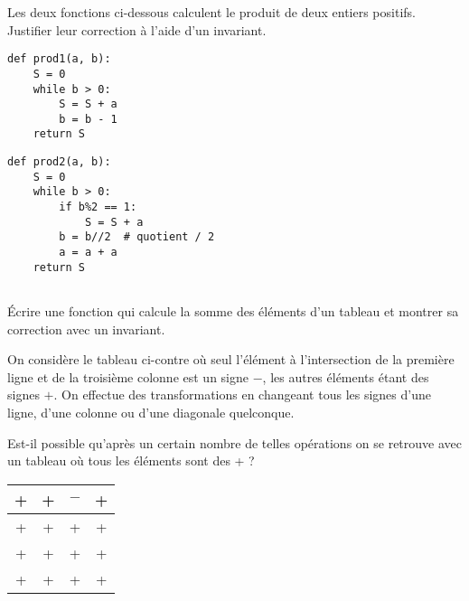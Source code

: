 \exercice{}
Les deux fonctions ci-dessous calculent le produit de deux entiers positifs. Justifier leur correction à l'aide d'un invariant.

\begin{minipage}{0.4\linewidth} 
 \begin{lstlisting}
def prod1(a, b):
    S = 0
    while b > 0:
        S = S + a
        b = b - 1
    return S
\end{lstlisting}

\end{minipage}
\hfill 
\begin{minipage}{0.47\linewidth} 
\begin{lstlisting}
def prod2(a, b):
    S = 0
    while b > 0:
        if b%2 == 1:
            S = S + a
        b = b//2  # quotient / 2 
        a = a + a
    return S
    

\end{lstlisting}

\end{minipage}




\entrainement{}

\'Ecrire une fonction qui calcule la somme des éléments d'un tableau et montrer sa correction avec un invariant.

\entrainement{}

\begin{minipage}{0.7\linewidth} %
\medskip

 On consid\`{e}re le tableau ci-contre o\`{u} seul l'\'{e}l\'{e}ment \`{a}
l'intersection de la premi\`{e}re ligne et de la troisi\`{e}me
colonne est un signe \og $-$\fg{}, les autres \'{e}l\'{e}ments
\'{e}tant des signes \og $+$\fg{}.
On effectue des transformations en changeant tous les signes d'une
ligne, d'une colonne ou d'une diagonale quelconque. 

Est-il possible
qu'apr\`{e}s un certain nombre de telles op\'{e}rations on se retrouve avec
un tableau o\`{u} tous les \'{e}l\'{e}ments sont des \og +\fg{} ?

\end{minipage}%
\hfill 
\begin{minipage}{0.3\linewidth} 
\begin{center}
\begin{tabular}[t]{|c|c|c|c|}
  \hline
  + & + & $-$ & + \\
  \hline
  + & + & + & + \\
  \hline
  + & + & + & + \\
  \hline
  + & + & + & + \\
  \hline
\end{tabular}\\
\end{center}
\end{minipage}
\bigskip



